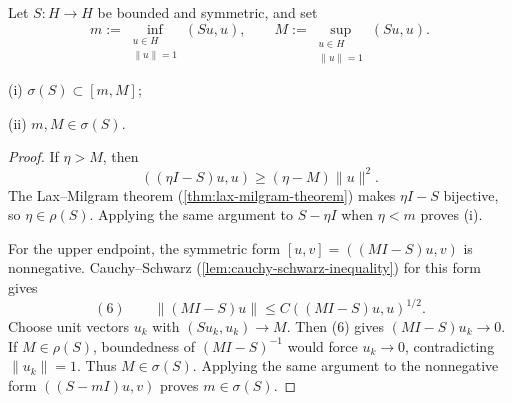 Let $S:H\to H$ be bounded and symmetric, and set
\[
m:=\inf_{\substack{u\in H\\\|u\|=1}}(Su,u),
\qquad
M:=\sup_{\substack{u\in H\\\|u\|=1}}(Su,u).
\]

\begin{lemma}
\label{lem:bounds-on-spectrum-symmetric-operator}
(i) $\sigma(S)\subset[m,M]$;

(ii) $m,M\in\sigma(S)$.
\end{lemma}
\begin{proof}
\sketch If $\eta>M$, then
\[
((\eta I-S)u,u)\geq(\eta-M)\|u\|^2.
\]
The Lax--Milgram theorem (\cref{thm:lax-milgram-theorem}) makes $\eta I-S$ bijective, so $\eta\in\rho(S)$. Applying the same argument to $S-\eta I$ when $\eta<m$ proves (i).

For the upper endpoint, the symmetric form $[u,v]=((MI-S)u,v)$ is nonnegative. Cauchy--Schwarz (\cref{lem:cauchy-schwarz-inequality}) for this form gives
\[
(6)\qquad
\|(MI-S)u\|
\leq C((MI-S)u,u)^{1/2}.
\]
Choose unit vectors $u_k$ with $(Su_k,u_k)\to M$. Then (6) gives $(MI-S)u_k\to0$. If $M\in\rho(S)$, boundedness of $(MI-S)^{-1}$ would force $u_k\to0$, contradicting $\|u_k\|=1$. Thus $M\in\sigma(S)$. Applying the same argument to the nonnegative form $((S-mI)u,v)$ proves $m\in\sigma(S)$.
\end{proof}
